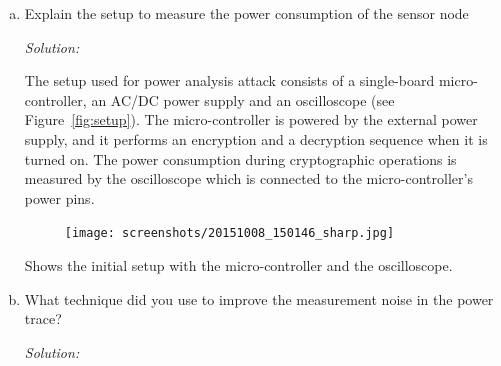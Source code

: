 \documentclass[a4paper,11pt]{article}
\newenvironment{solution}%
{\par{\noindent\small\textit{Solution:}}\vspace{-12pt}\begin{framed}}%
{\end{framed}\par}
\begin{document}
\begin{enumerate}[(a)]
\item Explain the setup to measure the power consumption of the sensor node
\ifsolution\begin{solution}
The setup used for power analysis attack consists of a single-board micro-controller, an AC/DC power supply and an oscilloscope (see Figure~\ref{fig:setup}). The micro-controller is powered by the external power supply, and it performs an encryption and a decryption sequence when it is turned on. The power consumption during cryptographic operations is measured by the oscilloscope which is connected to the micro-controller's power pins.

\makeatletter
\begin{center}
\def\@captype{figure}

\begin{subfigure}[b]{0.7\textwidth}
	\texttt{[image: screenshots/20151008\_150146\_sharp.jpg]}
\end{subfigure}
\caption{Shows the initial setup with the micro-controller and the oscilloscope.}
\label{fig:setup}

\end{center}
\makeatother

\end{solution}\fi

\newpage
\item What technique did you use to improve the measurement noise in
the power trace?
\ifsolution\begin{solution}

\makeatletter
\begin{center}
\def\@captype{figure}


\end{center}
\end{solution}
\end{enumerate}
\end{document}
